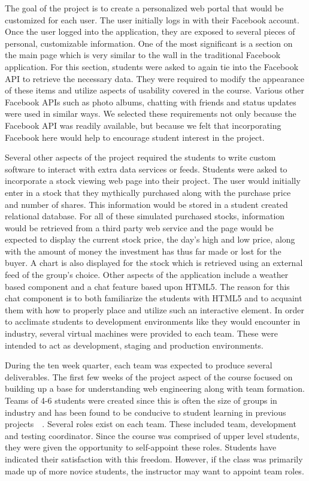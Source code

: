 \documentclass[conference]{IEEEtran}
\begin{document}
The goal of the project is to create a personalized web portal that would be customized for each user. The user initially logs in with their Facebook account. Once the user logged into the application, they are exposed to several pieces of personal, customizable information. One of the most significant is a section on the main page which is very similar to the wall in the traditional Facebook application. For this section, students were asked to again tie into the Facebook API to retrieve the necessary data. They were required to modify the appearance of these items and utilize aspects of usability covered in the course. Various other Facebook APIs such as photo albums, chatting with friends and status updates were used in similar ways. We selected these requirements not only because the Facebook API was readily available, but because we felt that incorporating Facebook here would help to encourage student interest in the project.

Several other aspects of the project required the students to write custom software to interact with extra data services or feeds. Students were asked to incorporate a stock viewing web page into their project. The user would initially enter in a stock that they mythically purchased along with the purchase price and number of shares. This information would be stored in a student created relational database. For all of these simulated purchased stocks, information would be retrieved from a third party web service and the page would be expected to display the current stock price, the day's high and low price, along with the amount of money the investment has thus far made or lost for the buyer. A chart is also displayed for the stock which is retrieved using an external feed of the group’s choice. Other aspects of the application include a weather based component and a chat feature based upon HTML5. The reason for this chat component is to both familiarize the students with HTML5 and to acquaint them with how to properly place and utilize such an interactive element. In order to acclimate students to development environments like they would encounter in industry, several virtual machines were provided to each team. These were intended to act as development, staging and production environments.

During the ten week quarter, each team was expected to produce several deliverables. The first few weeks of the project aspect of the course focused on building up a base for understanding web engineering along with team formation. Teams of 4-6 students were created since this is often the size of groups in industry and has been found to be conducive to student learning in previous projects~\cite{Guo:2009:GPS:1516546.1516579}~\cite{Petkovic:2006:TPS:1140123.1140202}. Several roles exist on each team. These included team, development and testing coordinator. Since the course was comprised of upper level students, they were given the opportunity to self-appoint these roles. Students have indicated their satisfaction with this freedom. However, if the class was primarily made up of more novice students, the instructor may want to appoint team roles.
\end{document}
